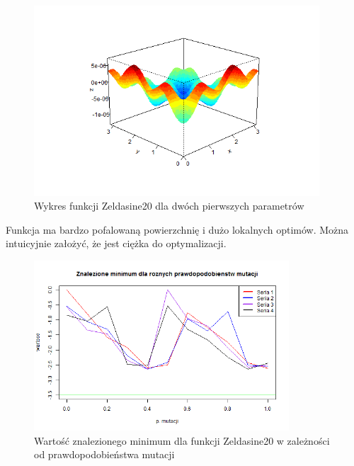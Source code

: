 \documentclass[11pt, a4paper]{article}
\newcommand{\fbi}{\leavevmode{\parindent=1em\indent}}
\begin{document}
\begin{figure}[H]
	\begin{center}
		\includegraphics[width=0.95\textwidth]{./assets/Zeldasine201.png}
		\caption{Wykres funkcji Zeldasine20 dla dwóch pierwszych parametrów}
		\label{fig:zeldasine1}
	\end{center}
\end{figure}

\fbi
Funkcja ma bardzo pofalowaną powierzchnię i dużo lokalnych optimów. Można intuicyjnie założyć, że jest ciężka do optymalizacji.

\begin{figure}[H]
	\begin{center}
		\includegraphics[width=0.85\textwidth]{./assets/Zeldasine202.png}
		\caption{Wartość znalezionego minimum dla funkcji Zeldasine20 w zależności od prawdopodobieństwa mutacji}
		\label{fig:zeldasine2}
	\end{center}
\end{figure}
\end{document}
